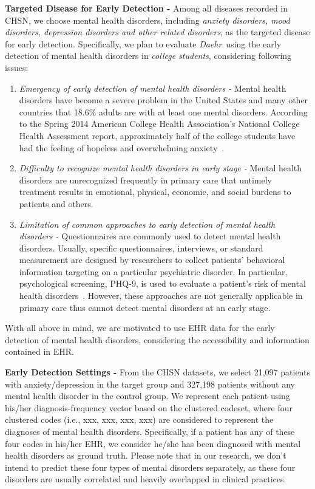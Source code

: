 \documentclass[journal,compsoc]{IEEEtran}
\newcommand{\TheName}{\mbox{\emph{Daehr}}}
\begin{document}
\textbf{Targeted Disease for Early Detection - } Among all diseases recorded in CHSN, we choose mental health disorders, including \emph{anxiety disorders, mood disorders, depression disorders and other related disorders}, as the targeted disease for early detection. Specifically, we plan to evaluate \TheName\ using the early detection of mental health disorders in \emph{college students}, considering following issues:
\begin{enumerate}
\item  \emph{Emergency of early detection of mental health disorders - } Mental health disorders have become a severe problem in the United States and many other countries that 18.6\% adults are with at least one mental disorders. According to the Spring 2014 American College Health Association's National College Health Assessment report, approximately half of the college students have had the feeling of hopeless and overwhelming anxiety~\cite{ACHA2014}. 

\item  \emph{Difficulty to recognize mental health disorders in early stage - } Mental health disorders are unrecognized frequently in primary care that untimely treatment results in emotional, physical, economic, and social burdens to patients and others. 

\item \emph{Limitation of common approaches to early detection of mental health disorders - } Questionnaires are commonly used to detect mental health disorders. Usually, specific questionnaires, interviews, or standard measurement are designed by researchers to collect patients' behavioral information targeting on a particular psychiatric disorder. In particular, psychological screening, PHQ-9, is used to evaluate a patient's risk of mental health disorders~\cite{kroenke2002phq}. However, these approaches are not generally applicable in primary care thus cannot detect mental disorders at an early stage. 

\end{enumerate}
%
With all above in mind, we are motivated to use EHR data for the early detection of mental health disorders, considering the accessibility and information contained in EHR. 

\textbf{Early Detection Settings - } From the CHSN datasets, we select 21,097 patients with anxiety/depression in the target group and 327,198 patients without any mental health disorder in the control group. We represent each patient using his/her diagnosis-frequency vector based on the clustered codeset, where four clustered codes (i.e., xxx, xxx, xxx, xxx) are considered to represent the diagnoses of mental health disorders. Specifically, if a patient has any of these four codes in his/her EHR, we consider he/she has been diagnosed with mental health disorders as ground truth. Please note that in our research, we don't intend to predict these four types of mental disorders separately, as these four disorders are usually correlated and heavily overlapped in clinical practices.
\end{document}
